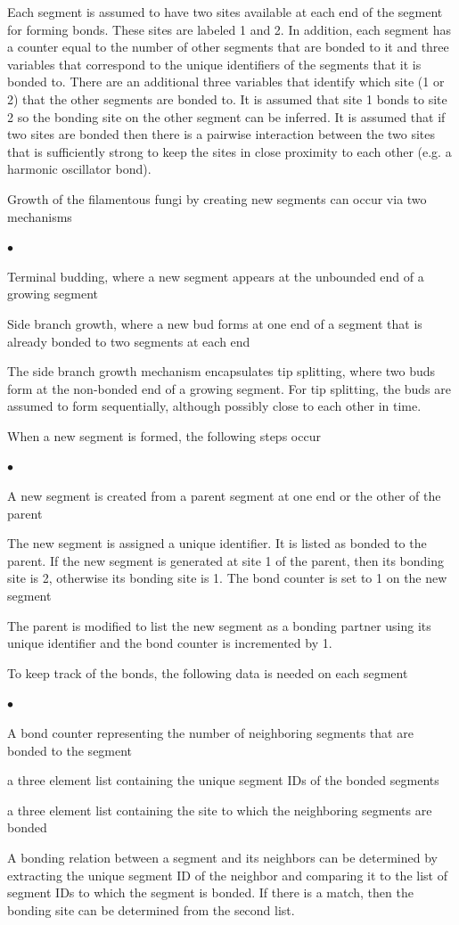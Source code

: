 \documentclass[12pt]{article}
\begin{document}
Each segment is assumed to have two sites available at each end of the segment for
forming bonds. These sites are labeled 1 and 2. In addition, each segment has
a counter equal to the number of other segments that are bonded to it and three
variables that correspond to the unique identifiers of the segments that it is
bonded to. There are an additional three variables that identify which site (1 or
2) that the other segments are bonded to. It is assumed that site 1 bonds to site
2 so the bonding site on the other segment can be inferred. It is assumed that if
two sites are bonded then there is a pairwise interaction between the two sites
that is sufficiently strong to keep the sites in close proximity to each other (e.g.
a harmonic oscillator bond).

Growth of the filamentous fungi by creating new segments can occur via two mechanisms
\begin{list}{$\bullet$}{}
\item Terminal budding, where a new segment appears at the unbounded end of a
growing segment
\item Side branch growth, where a new bud forms at one end of a segment that is
already bonded to two segments at each end
\end{list}
The side branch growth mechanism encapsulates tip splitting, where two buds form
at the non-bonded end of a growing segment. For tip splitting, the buds are assumed
to form sequentially, although possibly close to each other in time.

When a new segment is formed, the following steps occur
\begin{list}{$\bullet$}{}
\item A new segment is created from a parent segment at one end or the other of
the parent
\item The new segment is assigned a unique identifier. It is listed as bonded to
the parent. If the new segment is generated at site 1 of the parent, then its
bonding site is 2, otherwise its bonding site is 1. The bond counter is set to 1
on the new segment
\item The parent is modified to list the new segment as a bonding partner using
its unique identifier and the bond counter is incremented by 1.
\end{list}

To keep track of the bonds, the following data is needed on each segment
\begin{list}{$\bullet$}{}
\item A bond counter representing the number of neighboring segments that are bonded
to the segment
\item a three element list containing the unique segment IDs of the bonded
segments
\item a three element list containing the site to which the neighboring segments
are bonded
\end{list}
A bonding relation between a segment and its neighbors can be determined by
extracting the unique segment ID of the neighbor and comparing it to the list 
of segment IDs to which the segment is bonded. If there is a match, then the bonding
site can be determined from the second list.
\end{document}
